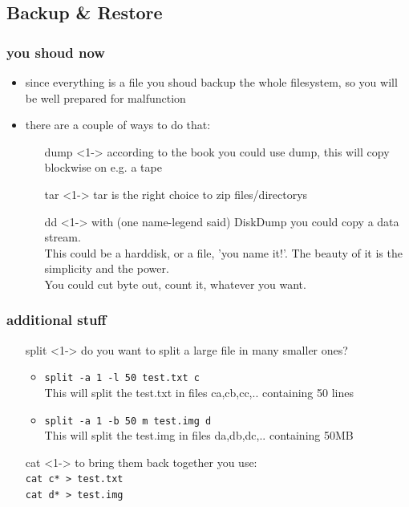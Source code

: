 \documentclass[handout]{beamer}
\newcommand{\code}[1]{\colorbox{lGray}{\texttt{#1}}}
\begin{document}
    \subsection{Backup \& Restore}
	    \begin{frame}
			\frametitle{you shoud now}
			\begin{itemize}
                \item<1-> since everything is a file you shoud backup the whole
                filesystem, so you will be well prepared for malfunction
                \item<1-> there are a couple of ways to do that:
                \begin{itemize}
                    \item[dump]<1-> according to the book you could use dump,
                                    this will copy blockwise on e.g. a tape
                    \item[tar]<1-> tar is the right choice to zip files/directorys
                    \item[dd]<1-> with (one name-legend said) DiskDump you could copy a data stream.\\
                    This could be a harddisk, or a file, 'you name it!'. The beauty of it is the simplicity and the power. \\
                    You could cut byte out, count it, whatever you want.
                \end{itemize}
            \end{itemize}
		\end{frame}
        \begin{frame}
            \frametitle{additional stuff}
			\begin{itemize}
                \item[split]<1-> do you want to split a large file in many smaller ones?
                \begin{itemize}
                    \item<1-> \code{split -a 1 -l 50 test.txt c} \\
                        This will split the test.txt in files ca,cb,cc,.. containing 50 lines
                    \item<1-> \code{split -a 1 -b 50 m test.img d} \\
                        This will split the test.img in files da,db,dc,.. containing 50MB
                \end{itemize}
                \item[cat]<1-> to bring them back together you use: \\
                            \code{cat c* > test.txt} \\
                            \code{cat d* > test.img} \\
			\end{itemize}
		\end{frame}
\end{document}
